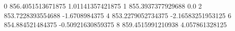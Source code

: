 0 856.4051513671875 1.01141357421875
1 855.3937377929688 0.0
2 853.7228393554688 -1.6708984375
4 853.2279052734375 -2.16583251953125
6 854.884521484375 -0.50921630859375
8 859.4515991210938 4.057861328125
